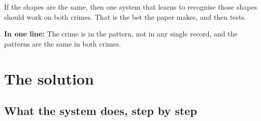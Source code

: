 \documentclass[11pt,a4paper]{article}
\newcommand{\inoneline}[1]{%
  \medskip\noindent\colorbox{gray!10}{\parbox{\dimexpr\linewidth-2\fboxsep}{%
  \textbf{In one line:} #1}}\medskip}
\begin{document}
If the shapes are the same, then one system that learns to recognise those
shapes should work on both crimes. That is the bet the paper makes, and then
tests.

\inoneline{The crime is in the pattern, not in any single record, and the
patterns are the same in both crimes.}

\section{The solution}

\subsection{What the system does, step by step}
\end{document}
